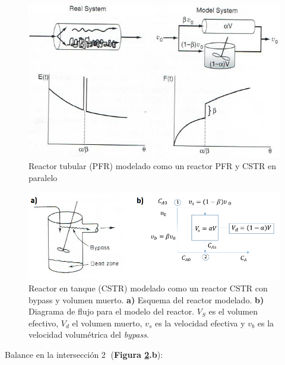         \begin{figure}
            \centering
            \includegraphics[width=.9\textwidth]{img/esquemas/combinacion_reactores_ideales_tubular_tanque.png}
            \caption{Reactor tubular (PFR) modelado como un reactor PFR y CSTR en paralelo}
            \label{fig:combinacion_reactores_ideales_tubular_tanque}
        \end{figure}
        
        \begin{figure}
            \centering
            \includegraphics[width=.9\textwidth]{img/esquemas/combinacion_reactores_ideales_bypass_volumen_muerto.png}
            \caption[Reactor en tanque (CSTR) modelado como un reactor CSTR con bypass y volumen muerto]{Reactor en tanque (CSTR) modelado como un reactor CSTR con bypass y volumen muerto. \textbf{a)} Esquema del reactor modelado. \textbf{b)} Diagrama de flujo para el modelo del reactor. \(V_{S}\) es el volumen efectivo, \(V_{d}\) el volumen muerto, \(v_{s}\) es la velocidad efectiva y \(v_{b}\) es la velocidad volumétrica del \textit{bypass}.}
            \label{fig:combinacion_reactores_ideales_bypass_volumen_muerto}
        \end{figure}
        
        Balance en la intersección \textcircled{2} (\textbf{Figura \ref{fig:combinacion_reactores_ideales_bypass_volumen_muerto}.b}):
        
